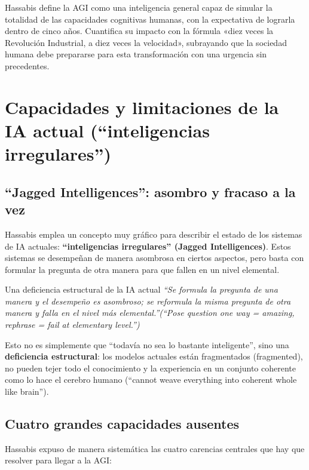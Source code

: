 \documentclass[a4paper]{article}
\begin{document}
Hassabis define la AGI como una inteligencia general capaz de simular la totalidad de las capacidades cognitivas humanas, con la expectativa de lograrla dentro de cinco años. Cuantifica su impacto con la fórmula «diez veces la Revolución Industrial, a diez veces la velocidad», subrayando que la sociedad humana debe prepararse para esta transformación con una urgencia sin precedentes.

\section{Capacidades y limitaciones de la IA actual (``inteligencias irregulares'')}

\subsection{``Jagged Intelligences'': asombro y fracaso a la vez}

Hassabis emplea un concepto muy gráfico para describir el estado de los sistemas de IA actuales: \textbf{``inteligencias irregulares'' (Jagged Intelligences)}. Estos sistemas se desempeñan de manera asombrosa en ciertos aspectos, pero basta con formular la pregunta de otra manera para que fallen en un nivel elemental.

\begin{warningbox}{Una deficiencia estructural de la IA actual}
\textit{``Se formula la pregunta de una manera y el desempeño es asombroso; se reformula la misma pregunta de otra manera y falla en el nivel más elemental.''(``Pose question one way = amazing, rephrase = fail at elementary level.'')}

Esto no es simplemente que ``todavía no sea lo bastante inteligente'', sino una \textbf{deficiencia estructural}: los modelos actuales están fragmentados (fragmented), no pueden tejer todo el conocimiento y la experiencia en un conjunto coherente como lo hace el cerebro humano (``cannot weave everything into coherent whole like brain'').
\end{warningbox}

\subsection{Cuatro grandes capacidades ausentes}

Hassabis expuso de manera sistemática las cuatro carencias centrales que hay que resolver para llegar a la AGI:
\end{document}
